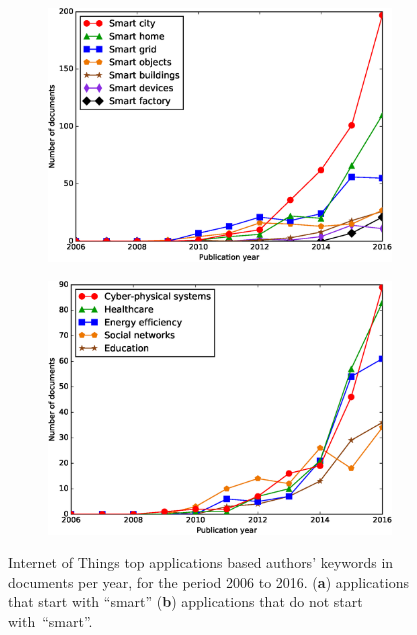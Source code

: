 \documentclass[symmetry,article,accept,moreauthors,pdftex10pt,a4paper]{mdpi}
\begin{document}
\begin{figure}[H]
	\centering
	\begin{subfigure}[b]{0.49\textwidth}
		\includegraphics[width=\textwidth]{./graphs/figure5a.eps}
		\caption{}
		\label{fig_smart_things}
	\end{subfigure}
	\begin{subfigure}[b]{0.49\textwidth}
		\includegraphics[width=\textwidth]{./graphs/figure5b.eps}
		\caption{}
		\label{fig_applications_a}
	\end{subfigure}
	\vspace{-12pt}

	\caption{Internet of Things top applications based authors' keywords in documents per year, for the period 2006 to 2016.  (\textbf{a}) applications that start with ``smart'' (\textbf{b}) applications that do not start with~``smart''.}
	\label{fig_applications}
\end{figure}
\end{document}
